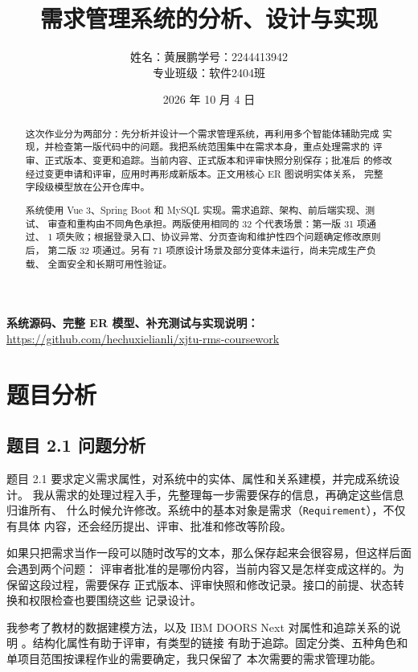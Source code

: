 \documentclass[UTF8,a4paper,12pt]{ctexart}
\title{\heiti\LARGE 需求管理系统的分析、设计与实现}
\author{姓名：黄展鹏\qquad 学号：2244413942\\[0.8em]专业班级：软件2404班}
\date{2026 年 10 月 4 日}
\newcommand{\code}[1]{\allowbreak\nolinkurl{#1}\allowbreak}
\newcommand{\repo}{\url{https://github.com/hechuxielianli/xjtu-rms-coursework}}
\begin{document}
\maketitle
\thispagestyle{empty}
\vspace{5cm}
\begin{abstract}
这次作业分为两部分：先分析并设计一个需求管理系统，再利用多个智能体辅助完成
实现，并检查第一版代码中的问题。我把系统范围集中在需求本身，重点处理需求的
评审、正式版本、变更和追踪。当前内容、正式版本和评审快照分别保存；批准后
的修改经过变更申请和评审，应用时再形成新版本。正文用核心 ER 图说明实体关系，
完整字段级模型放在公开仓库中。

系统使用 Vue 3、Spring Boot 和 MySQL 实现。需求追踪、架构、前后端实现、测试、
审查和重构由不同角色承担。两版使用相同的 32 个代表场景：第一版 31 项通过、
1 项失败；根据登录入口、协议异常、分页查询和维护性四个问题确定修改原则后，
第二版 32 项通过。另有 71 项原设计场景及部分变体未运行，尚未完成生产负载、
全面安全和长期可用性验证。

\end{abstract}
\noindent\textbf{系统源码、完整 ER 模型、补充测试与实现说明：}\\
\repo

\clearpage
\setcounter{tocdepth}{2}
\begingroup{}\tableofcontents\endgroup
\clearpage

\section{题目分析}
\subsection{题目 2.1 问题分析}
题目 2.1 要求定义需求属性，对系统中的实体、属性和关系建模，并完成系统设计。
我从需求的处理过程入手，先整理每一步需要保存的信息，再确定这些信息归谁所有、
什么时候允许修改。系统中的基本对象是需求（\code{Requirement}），不仅有具体
内容，还会经历提出、评审、批准和修改等阶段。

如果只把需求当作一段可以随时改写的文本，那么保存起来会很容易，但这样后面会遇到两个问题：
评审者批准的是哪份内容，当前内容又是怎样变成这样的。为保留这段过程，需要保存
正式版本、评审快照和修改记录。接口的前提、状态转换和权限检查也要围绕这些
记录设计。

我参考了教材的数据建模方法，以及 IBM DOORS Next 对属性和追踪关系的说明
\cite{textbook,doors-attributes,doors-links}。结构化属性有助于评审，有类型的链接
有助于追踪。固定分类、五种角色和单项目范围按课程作业的需要确定，我只保留了
本次需要的需求管理功能。
\end{document}
